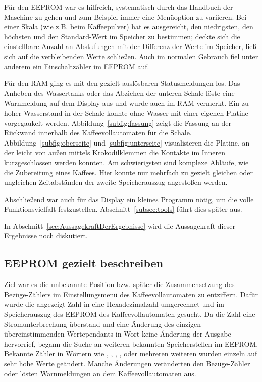 Für den \ac{EEPROM} war es hilfreich, systematisch durch das Handbuch der Maschine zu gehen und zum Beispiel immer eine Menüoption zu variieren.
Bei einer Skala (wie z.B. beim Kaffeepulver) hat es ausgereicht, den niedrigsten, den höchsten und den Standard-Wert im Speicher zu bestimmen;
deckte sich die einstellbare Anzahl an Abstufungen mit der Differenz der Werte im Speicher, ließ sich auf die verbleibenden Werte schließen.
Auch im normalen Gebrauch fiel unter anderem ein Einschaltzähler im \ac{EEPROM} auf.

Für den \ac{RAM} ging es mit den gezielt auslösbaren Statusmeldungen los.
Das Anheben des Wassertanks oder das Abziehen der unteren Schale löste eine Warnmeldung auf dem Display aus und wurde auch im \ac{RAM} vermerkt.
Ein zu hoher Wasserstand in der Schale konnte ohne Wasser mit einer eigenen Platine vorgegaukelt werden.
Abbildung~\ref{subfig:fassung} zeigt die Fassung an der Rückwand innerhalb des Kaffeevollautomaten für die Schale.
Abbildung~\ref{subfig:oberseite} und \ref{subfig:unterseite} visualisieren die Platine, an der leicht von außen mittels Krokodilklemmen die Kontakte im Inneren kurzgeschlossen werden konnten.
Am schwierigsten sind komplexe Abläufe, wie die Zubereitung eines Kaffees.
Hier konnte nur mehrfach zu gezielt gleichen oder ungleichen Zeitabständen der zweite Speicherauszug angestoßen werden.

Abschließend war auch für das Display ein kleines Programm nötig, um die volle Funktionsvielfalt festzustellen.
Abschnitt~\ref{subsec:tools} führt dies später aus.

In Abschnitt~\ref{sec:AussagekraftDerErgebnisse} wird die Aussagekraft dieser Ergebnisse noch diskutiert.

\subsection{EEPROM gezielt beschreiben}\label{subsec:Vorgehen2}
Ziel war es die unbekannte Position bzw. später die Zusammensetzung des Bezüge-Zählers im Einstellungsmenü des Kaffeevollautomaten zu entziffern.
Dafür wurde die angezeigt Zahl in eine Hexadezimalzahl umgerechnet und im Speicherauszug des \ac{EEPROM} des Kaffeevollautomaten gesucht.
Da die Zahl eine Stromunterbrechung überstand und eine Änderung des einzigen übereinstimmenden Wertependants in Wort  keine Änderung der Ausgabe hervorrief, begann die Suche an weiteren bekannten Speicherstellen im \ac{EEPROM}.
Bekannte Zähler in Wörtern wie , , , ,  oder mehreren weiteren wurden einzeln auf sehr hohe Werte geändert.
Manche Änderungen veränderten den Bezüge-Zähler oder lösten Warnmeldungen an dem Kaffeevollautomaten aus.

